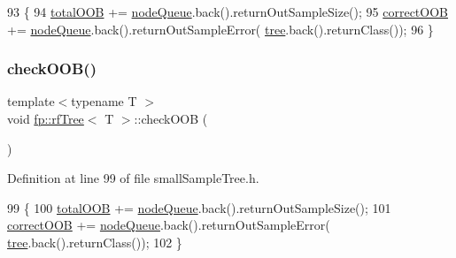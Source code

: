 \begin{DoxyCode}
93                                       \{
94                     \hyperlink{classfp_1_1rfTree_aa200dc228adc20c12e514364d2b674df}{totalOOB} += \hyperlink{classfp_1_1rfTree_af72d0a2f930fd480dfb4858885c2df23}{nodeQueue}.back().returnOutSampleSize();
95                     \hyperlink{classfp_1_1rfTree_a83832650bcea8d63cdcd480d9ddc6e6e}{correctOOB} += \hyperlink{classfp_1_1rfTree_af72d0a2f930fd480dfb4858885c2df23}{nodeQueue}.back().returnOutSampleError(
      \hyperlink{classfp_1_1rfTree_a1d5c209715f4044a85878c17e2b3ee53}{tree}.back().returnClass());
96                 \}
\end{DoxyCode}
\mbox{\label{classfp_1_1rfTree_a45e47b318c90a1359840ab6161f20ab1}} 
\subsubsection{\texorpdfstring{check\+O\+O\+B()}{checkOOB()}\hspace{0.1cm}{\footnotesize\ttfamily [2/2]}}
{\footnotesize\ttfamily template$<$typename T $>$ \\
void \hyperlink{classfp_1_1rfTree}{fp\+::rf\+Tree}$<$ T $>$\+::check\+O\+OB (\begin{DoxyParamCaption}{ }\end{DoxyParamCaption})\hspace{0.3cm}{\ttfamily [inline]}}



Definition at line 99 of file small\+Sample\+Tree.\+h.


\begin{DoxyCode}
99                                       \{
100                     \hyperlink{classfp_1_1rfTree_aa200dc228adc20c12e514364d2b674df}{totalOOB} += \hyperlink{classfp_1_1rfTree_af72d0a2f930fd480dfb4858885c2df23}{nodeQueue}.back().returnOutSampleSize();
101                     \hyperlink{classfp_1_1rfTree_a83832650bcea8d63cdcd480d9ddc6e6e}{correctOOB} += \hyperlink{classfp_1_1rfTree_af72d0a2f930fd480dfb4858885c2df23}{nodeQueue}.back().returnOutSampleError(
      \hyperlink{classfp_1_1rfTree_a1d5c209715f4044a85878c17e2b3ee53}{tree}.back().returnClass());
102                 \}
\end{DoxyCode}
\mbox{\label{classfp_1_1rfTree_ad226037e7f93c0fa2a1a960e19a87bed}} 
